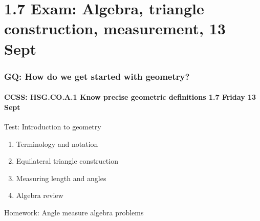 \documentclass{beamer}
\begin{document}
\section{1.7 Exam: Algebra, triangle construction, measurement, 13 Sept}
  \frame
  {
    \frametitle{GQ: How do we get started with geometry?}
    \framesubtitle{CCSS: HSG.CO.A.1 Know precise geometric definitions \hfill \alert{1.7 Friday 13 Sept}}

    \begin{block}{Test: Introduction to geometry}
    \begin{enumerate}
        \item Terminology and notation
        \item Equilateral triangle construction
        \item Measuring length and angles
        \item Algebra review
    \end{enumerate}
    \end{block}

    \vspace{1cm}
    Homework: Angle measure algebra problems\\
  }
\end{document}
